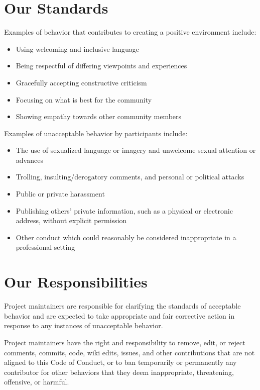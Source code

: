 \documentclass[
  letterpaper,
  oneside,
  open=any]{scrbook}
\providecommand{\tightlist}{%
  \setlength{\itemsep}{0pt}\setlength{\parskip}{0pt}}\usepackage{longtable,booktabs,array}
\begin{document}
\section{Our Standards}\label{our-standards}

Examples of behavior that contributes to creating a positive environment
include:

\begin{itemize}
\tightlist
\item
  Using welcoming and inclusive language
\item
  Being respectful of differing viewpoints and experiences
\item
  Gracefully accepting constructive criticism
\item
  Focusing on what is best for the community
\item
  Showing empathy towards other community members
\end{itemize}

Examples of unacceptable behavior by participants include:

\begin{itemize}
\tightlist
\item
  The use of sexualized language or imagery and unwelcome sexual
  attention or advances
\item
  Trolling, insulting/derogatory comments, and personal or political
  attacks
\item
  Public or private harassment
\item
  Publishing others' private information, such as a physical or
  electronic address, without explicit permission
\item
  Other conduct which could reasonably be considered inappropriate in a
  professional setting
\end{itemize}

\section{Our Responsibilities}\label{our-responsibilities}

Project maintainers are responsible for clarifying the standards of
acceptable behavior and are expected to take appropriate and fair
corrective action in response to any instances of unacceptable behavior.

Project maintainers have the right and responsibility to remove, edit,
or reject comments, commits, code, wiki edits, issues, and other
contributions that are not aligned to this Code of Conduct, or to ban
temporarily or permanently any contributor for other behaviors that they
deem inappropriate, threatening, offensive, or harmful.
\end{document}
